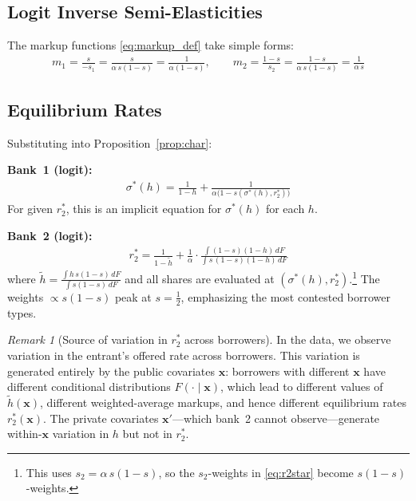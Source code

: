 \documentclass[12pt]{article}
\theoremstyle{plain}
\theoremstyle{plain}
\theoremstyle{definition}  %
\theoremstyle{remark}  %
\newtheorem{remark}[thm]{Remark}  %
\begin{document}
\subsection{Logit Inverse Semi-Elasticities}

The markup functions \eqref{eq:markup_def} take simple forms:
\begin{align}\label{eq:logit_m}
    m_1 = \frac{s}{-s_1} = \frac{s}{\alpha\, s(1-s)} = \frac{1}{\alpha(1-s)}, \qquad
    m_2 = \frac{1-s}{s_2} = \frac{1-s}{\alpha\, s(1-s)} = \frac{1}{\alpha\, s}
\end{align}

\subsection{Equilibrium Rates}

Substituting into Proposition~\ref{prop:char}:

\medskip\noindent
\textbf{Bank~1 (logit):}
\begin{align}\label{eq:sigma_logit}
    \sigma^*(h) = \frac{1}{1-h} + \frac{1}{\alpha\big(1 - s(\sigma^*(h), r_2^*)\big)}
\end{align}
For given $r_2^*$, this is an implicit equation for $\sigma^*(h)$ for each $h$.

\medskip\noindent
\textbf{Bank~2 (logit):}
\begin{align}\label{eq:r2_logit}
    r_2^* = \frac{1}{1 - \tilde{h}} + \frac{1}{\alpha}\cdot\frac{\displaystyle\int (1-s)(1-h)\, dF}{\displaystyle\int s\,(1-s)(1-h)\, dF}
\end{align}
where $\tilde{h} = \frac{\int h\, s(1-s)\, dF}{\int s(1-s)\, dF}$ and all shares are evaluated at $(\sigma^*(h), r_2^*)$.\footnote{This uses $s_2 = \alpha\,s(1-s)$, so the $s_2$-weights in \eqref{eq:r2star} become $s(1-s)$-weights.} The weights $\propto s(1-s)$ peak at $s = \frac{1}{2}$, emphasizing the most contested borrower types.

\begin{remark}[Source of variation in $r_2^*$ across borrowers]\label{rem:r2_variation}
In the data, we observe variation in the entrant's offered rate across borrowers. This variation is generated entirely by the public covariates $\mathbf{x}$: borrowers with different $\mathbf{x}$ have different conditional distributions $F(\cdot \mid \mathbf{x})$, which lead to different values of $\tilde{h}(\mathbf{x})$, different weighted-average markups, and hence different equilibrium rates $r_2^*(\mathbf{x})$. The private covariates $\mathbf{x}'$---which bank~2 cannot observe---generate within-$\mathbf{x}$ variation in $h$ but not in $r_2^*$.
\end{remark}
\end{document}
